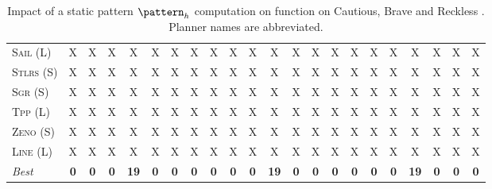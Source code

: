 \begin{table}[tb]
{\begin{tabular}{|l||ccccccc||ccccccc||ccccccc||}
\textsc{Sail} (L)&X&X&X&X&X&X&X&X&X&X&X&X&X&X&X&X&X&X&X&X&X\\
\textsc{Stlrs} (S)&X&X&X&X&X&X&X&X&X&X&X&X&X&X&X&X&X&X&X&X&X\\
\textsc{Sgr} (S)&X&X&X&X&X&X&X&X&X&X&X&X&X&X&X&X&X&X&X&X&X\\
\textsc{Tpp} (L)&X&X&X&X&X&X&X&X&X&X&X&X&X&X&X&X&X&X&X&X&X\\
\textsc{Zeno} (S)&X&X&X&X&X&X&X&X&X&X&X&X&X&X&X&X&X&X&X&X&X\\
\textsc{Line} (L)&X&X&X&X&X&X&X&X&X&X&X&X&X&X&X&X&X&X&X&X&X
\\\hline
\textit{Best}&\textbf{0}&\textbf{0}&\textbf{0}&\textbf{19}&\textbf{0}&\textbf{0}&\textbf{0}&\textbf{0}&\textbf{0}&\textbf{0}&\textbf{19}&\textbf{0}&\textbf{0}&\textbf{0}&\textbf{0}&\textbf{0}&\textbf{0}&\textbf{19}&\textbf{0}&\textbf{0}&\textbf{0}\\\hline

        \end{tabular}}
        \caption{Impact of a static pattern $\pattern_h$ computation on function on Cautious, Brave and Reckless \pattyd. Planner names are abbreviated.}
        \label{tab:abl-patternh-static}
        \end{table}
        